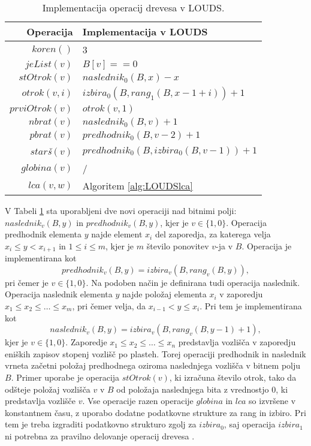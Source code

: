 \begin{table}[htb]
    \centering
    \caption{Implementacija operacij drevesa v LOUDS.}
    \begin{tabular}{r|l}
\textbf{Operacija}& \textbf{Implementacija v LOUDS} \\\hline
         $koren()$& 3\\
         $jeList(v)$& $B[v]==0$\\
         $stOtrok(v)$& $naslednik_0(B,x)-x$\\
         $otrok(v,i)$& $izbira_0(B, rang_1(B, x - 1 + i))+1$\\
         $prviOtrok(v)$& $otrok(v,1)$\\
         $nbrat(v)$& $naslednik_0(B,v)+1$ \\
         $pbrat(v)$& $predhodnik_0(B,v-2)+1$ \\
         $star$\textit{š}$(v)$& $predhodnik_0(B,izbira_0(B,v-1))+1$ \\
         $globina(v)$& / \\
         $lca(v,w)$&  Algoritem \ref{alg:LOUDSlca}\\

    \end{tabular}
    \label{tab:LOUDSop}
\end{table}



 V Tabeli \ref{tab:LOUDSop} sta uporabljeni dve novi operaciji nad bitnimi polji: $naslednik_v(B,y)$ in $predhodnik_v(B,y)$, kjer je $v\in \{1,0\}$. Operacija predhodnik elementa $y$ najde element $x_i$ del zaporedja, za katerega velja $x_i \le y < x_{i+1}$ in $1\le i\le m$, kjer je $m$ število ponovitev $v$-ja v $B$. Operacija je implementirana kot
 $$predhodnik_v(B,y)=izbira_v(B,rang_v(B,y)),$$
 pri čemer je $v\in \{1,0\}$. Na podoben način je definirana tudi operacija naslednik. Operacija naslednik elementa $y$  najde položaj elementa $x_i$ v zaporedju $x_1\le x_2 \le \dots \le x_m$, pri čemer velja, da $x_{i-1}< y \le x_i$. Pri tem je implementirana kot
  $$naslednik_v(B,y)=izbira_v(B,rang_v(B,y-1)+1),$$
kjer je  $v\in \{1,0\}$. Zaporedje $x_1\le x_2 \le \dots \le x_n$ predstavlja vozlišča v zaporedju eniških zapisov stopenj vozlišč po plasteh. Torej operaciji predhodnik in naslednik vrneta začetni položaj predhodnega oziroma naslednjega vozlišča v bitnem polju $B$. Primer uporabe je operacija $stOtrok(v)$, ki izračuna število otrok, tako da odšteje položaj vozlišča $v$ v $B$ od položaja naslednjega bita z vrednostjo 0, ki predstavlja vozlišče $v$. Vse operacije razen operacije $globina$ in $lca$ so izvršene v konstantnem času, z uporabo dodatne podatkovne strukture za rang in izbiro. Pri tem je treba izgraditi podatkovno strukturo zgolj za $izbira_0$, saj operacija $izbira_1$ ni potrebna za pravilno delovanje operacij drevesa \cite{Navarro2016}.

